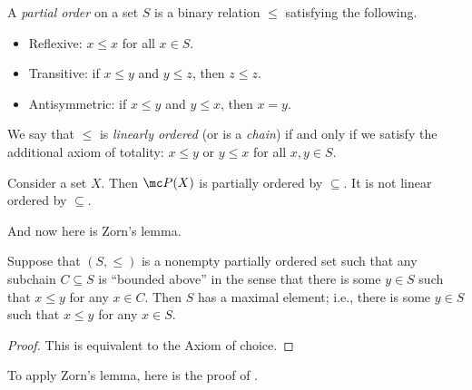 \documentclass[../notes.tex]{subfiles}
\begin{document}
\begin{definition}
	A \textit{partial order} on a set $S$ is a binary relation $\le$ satisfying the following.
	\begin{itemize}
		\item Reflexive: $x\le x$ for all $x\in S$.
		\item Transitive: if $x\le y$ and $y\le z$, then $z\le z$.
		\item Antisymmetric: if $x\le y$ and $y\le x$, then $x=y$.
	\end{itemize}
	We say that $\le$ is \textit{linearly ordered} (or is a \textit{chain}) if and only if we satisfy the additional axiom of totality: $x\le y$ or $y\le x$ for all $x,y\in S$.
\end{definition}
\begin{example}
	Consider a set $X$. Then $\mc P(X)$ is partially ordered by $\subseteq$. It is not linear ordered by $\subseteq$.
\end{example}
And now here is Zorn's lemma.
\begin{theorem} \label{thm:zorn}
	Suppose that $(S,\le)$ is a nonempty partially ordered set such that any subchain $C\subseteq S$ is ``bounded above'' in the sense that there is some $y\in S$ such that $x\le y$ for any $x\in C$. Then $S$ has a maximal element; i.e., there is some $y\in S$ such that $x\le y$ for any $x\in S$.
\end{theorem}
\begin{proof}
	This is equivalent to the Axiom of choice.
\end{proof}
To apply Zorn's lemma, here is the proof of .
\hbsubthm*
\end{document}
